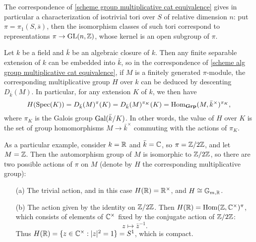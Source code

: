 \begin{example}
The correspondence of \cref{scheme group multiplicative cat equivalence} gives in particular a characterization of isotrivial tori over $S$ of relative dimension $n$: put $\pi=\pi_1(S,\bar{s})$, then the isomorphism classes of such tori correspond to representations $\pi\to\mathrm{GL}(n,\mathbb{Z})$, whose kernel is an open subgroup of $\pi$.
\end{example}

\begin{example}\label{scheme alg group multiplicative character construction}
Let $k$ be a field and $\bar{k}$ be an algebraic closure of $k$. Then any finite separable extension of $k$ can be embedded into $\bar{k}$, so in the correspondence of \cref{scheme alg group multiplicative cat equivalence}, if $M$ is a finitely generated $\pi$-module, the corresponding multiplicative group $H$ over $k$ can be deduced by descenting $D_{\bar{k}}(M)$. In particular, for any extension $K$ of $k$, we then have
\[H(\mathrm{Spec}(K))=D_{\bar{k}}(M)^{\pi}(K)=D_{\bar{k}}(M)^{\pi_K}(K)=\mathrm{Hom}_{\mathbf{Grp}}(M,\bar{k}^\times)^{\pi_K},\]
where $\pi_K$ is the Galois group $\mathrm{Gal}(\bar{k}/K)$. In other words, the value of $H$ over $K$ is the set of group homomorphisms $M\to\bar{k}^{\times}$ commuting with the actions of $\pi_K$.\par
As a particular example, consider $k=\mathbb{R}$ and $\bar{k}=\mathbb{C}$, so $\pi=\mathbb{Z}/2\mathbb{Z}$, and let $M=\mathbb{Z}$. Then the automorphism group of $M$ is isomorphic to $\mathbb{Z}/2\mathbb{Z}$, so there are two possible actions of $\pi$ on $M$ (denote by $H$ the corresponding multiplicative group):
\begin{enumerate}
    \item[(a)] The trivial action, and in this case $H(\mathbb{R})=\mathbb{R}^\times$, and $H\cong\mathbb{G}_{m,\mathbb{R}}$.
    \item[(b)] The action given by the identity on $\mathbb{Z}/2\mathbb{Z}$. Then $H(\mathbb{R})=\mathrm{Hom}(\mathbb{Z},\mathbb{C}^\times)^{\pi}$, which consists of elements of $\mathbb{C}^\times$ fixed by the conjugate action of $\mathbb{Z}/2\mathbb{Z}$:
    \[z\mapsto\bar{z}^{-1}.\]
    Thus $H(\mathbb{R})=\{z\in\mathbb{C}^{\times}:|z|^2=1\}=S^1$, which is compact. 
\end{enumerate}
\end{example}

